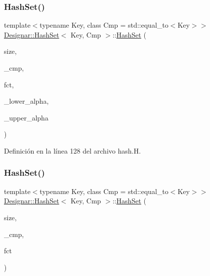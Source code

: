 \subsubsection{\texorpdfstring{Hash\+Set()}{HashSet()}\hspace{0.1cm}{\footnotesize\ttfamily [1/12]}}
{\footnotesize\ttfamily template$<$typename Key, class Cmp = std\+::equal\+\_\+to$<$\+Key$>$$>$ \\
\hyperlink{class_designar_1_1_hash_set}{Designar\+::\+Hash\+Set}$<$ Key, Cmp $>$\+::\hyperlink{class_designar_1_1_hash_set}{Hash\+Set} (\begin{DoxyParamCaption}\item[{\hyperlink{namespace_designar_aa72662848b9f4815e7bf31a7cf3e33d1}{nat\+\_\+t}}]{size,  }\item[{Cmp \&}]{\+\_\+cmp,  }\item[{\hyperlink{class_designar_1_1_hash_set_a05d8d111665c25bc17290c01fa299398}{Hash\+Fct\+Type}}]{fct,  }\item[{\hyperlink{namespace_designar_aca2c32af26808dbec1f3a3071fad25ce}{real\+\_\+t}}]{\+\_\+lower\+\_\+alpha,  }\item[{\hyperlink{namespace_designar_aca2c32af26808dbec1f3a3071fad25ce}{real\+\_\+t}}]{\+\_\+upper\+\_\+alpha }\end{DoxyParamCaption})\hspace{0.3cm}{\ttfamily [inline]}}



Definición en la línea 128 del archivo hash.\+H.

\mbox{\label{class_designar_1_1_hash_set_a6f60ca18ef5bcf8560b9827ca9678e58}} 
\subsubsection{\texorpdfstring{Hash\+Set()}{HashSet()}\hspace{0.1cm}{\footnotesize\ttfamily [2/12]}}
{\footnotesize\ttfamily template$<$typename Key, class Cmp = std\+::equal\+\_\+to$<$\+Key$>$$>$ \\
\hyperlink{class_designar_1_1_hash_set}{Designar\+::\+Hash\+Set}$<$ Key, Cmp $>$\+::\hyperlink{class_designar_1_1_hash_set}{Hash\+Set} (\begin{DoxyParamCaption}\item[{\hyperlink{namespace_designar_aa72662848b9f4815e7bf31a7cf3e33d1}{nat\+\_\+t}}]{size,  }\item[{Cmp \&}]{\+\_\+cmp,  }\item[{\hyperlink{class_designar_1_1_hash_set_a05d8d111665c25bc17290c01fa299398}{Hash\+Fct\+Type}}]{fct }\end{DoxyParamCaption})\hspace{0.3cm}{\ttfamily [inline]}}




